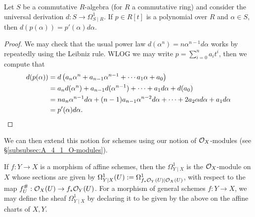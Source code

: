 \begin{prop}
	\label{prop:differential_of_poly_is_derivative}
	Let $S$ be a commutative $R$-algebra (for $R$ a commutative ring) and consider the universal derivation $d : S \to \Omega^1_{S \mid R}$. If $p \in R[t]$ is a polynomial over $R$ and $\alpha \in S$, then $d(p(\alpha)) = p'(\alpha)d\alpha$.
\end{prop}
\begin{proof}
	We may check that the usual power law $d(\alpha^n) = n\alpha^{n-1} d\alpha$ works by repeatedly using the Leibniz rule. WLOG we may write $p = \sum_{i=0}^n a_it^i$, then we compute that 
	\begin{align*}
		d(p(\alpha)) &= d\left(a_n \alpha^n + a_{n-1}\alpha^{n-1} + \cdots a_1 \alpha + a_0\right)\\ 
		&= a_n d(\alpha^{n}) + a_{n-1} d(\alpha^{n-1}) + \cdots + a_1 d\alpha + d(a_0)\\ 
		&= n a_n \alpha^{n-1} d\alpha + (n-1)a_{n-1}\alpha^{n-2} d\alpha + \cdots + 2a_2\alpha d\alpha + a_1d\alpha\\ 
		&= p'(\alpha)d\alpha. \qedhere
	\end{align*}
\end{proof}

We can then extend this notion for schemes using our notion of $\mathcal{O}_X$-modules (see \S\ref{subsubsec:A_4_1_O-modules}).

\begin{defn}
	If $f : Y \to X$ is a morphism of affine schemes, then the  $\Omega^1_{Y \mid X}$ is the $\mathcal{O}_X$-module on $X$ whose sections are given by $\Omega^1_{Y \mid X}(U) := \Omega^1_{f_*\mathcal{O}_Y(U) \mid \mathcal{O}_X(U)}$, with respect to the map $f^\#_U : \mathcal{O}_X(U)\to f_*\mathcal{O}_Y(U)$. For a morphism of general schemes $f: Y \to X$, we may define the sheaf $\Omega^1_{Y \mid X}$ by declaring it to be given by the above on the affine charts of $X, Y$.
\end{defn}

